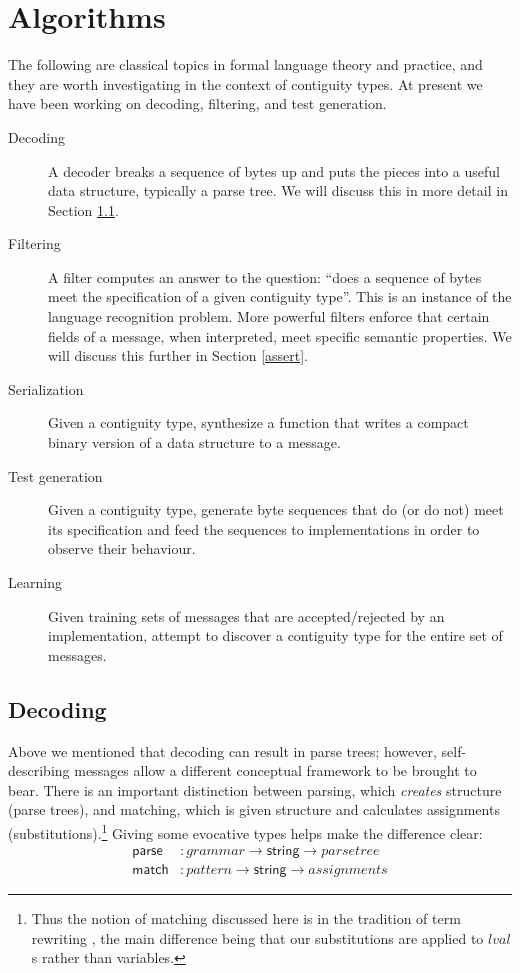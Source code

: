 \documentclass[a4paper,UKenglish,cleveref, autoref, thm-restate]{lipics-v2021}
\newcommand{\konst}[1]{\ensuremath{\mathsf{#1}}}
\begin{document}
\section{Algorithms}

The following are classical topics in formal language theory and
practice, and they are worth investigating in the context of
contiguity types. At present we have been working on decoding,
filtering, and test generation.

\begin{description}

\item [Decoding] A decoder breaks a sequence of bytes up and puts the
  pieces into a useful data structure, typically a parse tree. We will
  discuss this in more detail in Section \ref{decoding}.

\item [Filtering] A filter computes an answer to the question: ``does
  a sequence of bytes meet the specification of a given contiguity
  type''. This is an instance of the language recognition
  problem. More powerful filters enforce that certain fields of a
  message, when interpreted, meet specific semantic properties. We
  will discuss this further in Section \ref{assert}.

\item [Serialization] Given a contiguity type, synthesize a function
  that writes a compact binary version of a data structure to a message.

\item [Test generation] Given a contiguity type, generate byte
  sequences that do (or do not) meet its specification and feed the
  sequences to implementations in order to observe their behaviour.

\item [Learning] Given training sets of messages that are
  accepted/rejected by an implementation, attempt to discover a
  contiguity type for the entire set of messages.

\end{description}

\subsection{Decoding}
\label{decoding}

Above we mentioned that decoding can result in parse trees; however,
self-describing messages allow a different conceptual framework to be
brought to bear. There is an important distinction between parsing,
which \emph{creates} structure (parse trees), and matching, which is
given structure and calculates assignments
(substitutions).\footnote{Thus the notion of matching discussed here
  is in the tradition of term rewriting \cite{baader:nipkow}, the main
  difference being that our substitutions are applied to
  $\mathit{lval}$s rather than variables.} Giving some evocative types
helps make the difference clear:
%
\begin{align*}
  \konst{parse} &: \mathit{grammar} \to \konst{string} \to \mathit{parse tree} \\
  \konst{match} &: \mathit{pattern} \to \konst{string} \to \mathit{assignments}
\end{align*}
\end{document}
